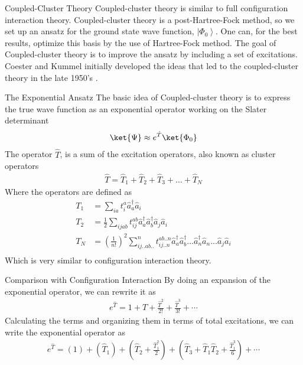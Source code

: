 \documentclass[twoside,english]{uiofysmaster}
\begin{document}
\begin{chapter}{Coupled-Cluster Theory} 
	Coupled-cluster theory is similar to full configuration interaction theory. Coupled-cluster theory is a post-Hartree-Fock method, so we set up an ansatz for the ground state wave function, $\left| \Phi_0 \right>$. One can, for the best results, optimize this basis by the use of Hartree-Fock method. The goal of Coupled-cluster theory is to improve the ansatz by including a set of excitations. Coester and Kummel initially developed the ideas that led to the coupled-cluster theory in the late 1950's \cite{MHJonline}. 
 	
 	\begin{section}{The Exponential Ansatz}
 		The basic idea of Coupled-cluster theory is to express the true wave function as an exponential operator working on the Slater determinant \cite{ShavittAndBartlett,MHJonline,Crawford}
 		\begin{align}
	 		\ket{\Psi} \approx e^{\hat T} \ket{\Phi_0}
	  	\end{align}
	  	The operator $\hat T$, is a sum of the excitation operators, also known as cluster operators
	  	\begin{align}
	  		\hat T = \hat T_1 + \hat T_2 + \hat T_3 + ... + \hat T_N
	  	\end{align}
	  	Where the operators are defined as
	  	\begin{align}
	  		T_1 &= \sum_{ia} t_i^a \hat a_a^{\dagger} \hat a_i \\
	  		T_2 &= \frac{1}{2} \sum_{ijab} t_{ij}^{ab} \hat a_a^{\dagger}\hat a_b^{\dagger} \hat a_j \hat a_i \\
	  		T_N &= \left(\frac{1}{n!}\right)^2 \sum_{ij..ab..}^n t_{ij..n}^{ab..n} \hat a_a^{\dagger}\hat a_b^{\dagger} ...\hat a_n^{\dagger} \hat a_n ... \hat a_j \hat a_i \\
	  	\end{align}
	  	Which is very similar to configuration interaction theory.
	\end{section}

	\begin{section}{Comparison with Configuration Interaction}
	  	By doing an expansion of the exponential operator, we can rewrite it as
	  	\begin{align}
	  		e^{\hat T} = 1 + \hat T + \frac{\hat T^2}{2!} + \frac{\hat T^3}{3!} + \cdots
	  	\end{align}
	  	Calculating the terms and organizing them in terms of total excitations, we can write the exponential operator as 
	  	\begin{align}
	  		e^{\hat T} = \left( 1 \right)  + \left( \hat T_1 \right) + \left( \hat T_2 + \frac{\hat T_1^2}{2} \right) + \left( \hat T_3 + \hat T_1 \hat T_2 + \frac{\hat T_1^3}{6} \right) + \cdots 
	  	\end{align}	
	  	

\end{section}
\end{chapter}
\end{document}
